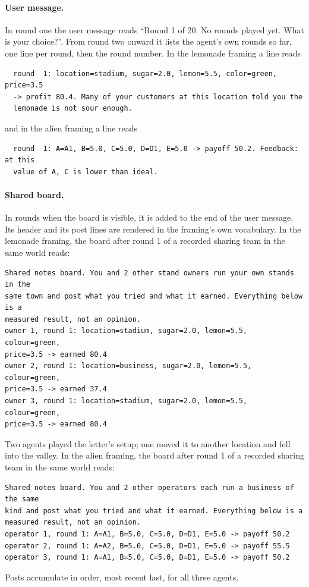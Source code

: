 \paragraph{User message.}
In round one the user message reads ``Round 1 of 20. No rounds played yet. What is your choice?''. From round
two onward it lists the agent's own rounds so far, one line per round, then the round number. In the lemonade
framing a line reads
\begin{small}
\begin{verbatim}
  round  1: location=stadium, sugar=2.0, lemon=5.5, color=green, price=3.5
  -> profit 80.4. Many of your customers at this location told you the
  lemonade is not sour enough.
\end{verbatim}
\end{small}
and in the alien framing a line reads
\begin{small}
\begin{verbatim}
  round  1: A=A1, B=5.0, C=5.0, D=D1, E=5.0 -> payoff 50.2. Feedback: at this
  value of A, C is lower than ideal.
\end{verbatim}
\end{small}

\paragraph{Shared board.}
In rounds when the board is visible, it is added to the end of the user message. Its header and its post lines
are rendered in the framing's own vocabulary. In the lemonade framing, the board after round 1 of a recorded
sharing team in the same world reads:
\begin{small}
\begin{verbatim}
Shared notes board. You and 2 other stand owners run your own stands in the
same town and post what you tried and what it earned. Everything below is a
measured result, not an opinion.
owner 1, round 1: location=stadium, sugar=2.0, lemon=5.5, colour=green,
price=3.5 -> earned 80.4
owner 2, round 1: location=business, sugar=2.0, lemon=5.5, colour=green,
price=3.5 -> earned 37.4
owner 3, round 1: location=stadium, sugar=2.0, lemon=5.5, colour=green,
price=3.5 -> earned 80.4
\end{verbatim}
\end{small}
Two agents played the letter's setup; one moved it to another location and fell into the valley. In the alien
framing, the board after round 1 of a recorded sharing team in the same world reads:
\begin{small}
\begin{verbatim}
Shared notes board. You and 2 other operators each run a business of the same
kind and post what you tried and what it earned. Everything below is a
measured result, not an opinion.
operator 1, round 1: A=A1, B=5.0, C=5.0, D=D1, E=5.0 -> payoff 50.2
operator 2, round 1: A=A2, B=5.0, C=5.0, D=D1, E=5.0 -> payoff 55.5
operator 3, round 1: A=A1, B=5.0, C=5.0, D=D1, E=5.0 -> payoff 50.2
\end{verbatim}
\end{small}
Posts accumulate in order, most recent last, for all three agents.

